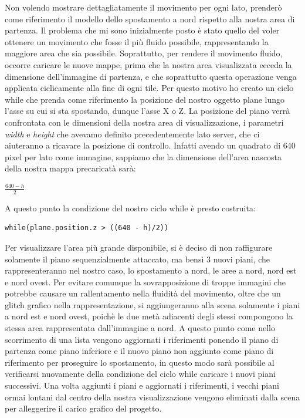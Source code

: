 Non volendo mostrare dettagliatamente il movimento per ogni lato, prenderò come riferimento il modello dello spostamento a nord rispetto alla nostra area di partenza. Il problema che mi sono inizialmente posto è stato quello del voler ottenere un movimento che fosse il più fluido possibile, rappresentando la maggiore area che sia possibile. Soprattutto, per rendere il movimento fluido, occorre caricare le nuove mappe, prima che la nostra area visualizzata ecceda la dimensione dell'immagine di partenza, e che soprattutto questa operazione venga applicata ciclicamente alla fine di ogni tile. Per questo motivo ho creato un ciclo while che prenda come riferimento la posizione del nostro oggetto plane lungo l'asse su cui si sta spostando, dunque l'asse X o Z. La posizione del piano verrà confrontata con le dimensioni della nostra area di visualizzazione, i parametri \textit{width} e \textit{height} che avevamo definito precedentemente lato server, che ci aiuteranno a ricavare la posizione di controllo. Infatti avendo un quadrato di 640 pixel per lato come immagine, sappiamo che la dimensione dell'area nascosta della nostra mappa precaricatà sarà:
\begin{center}
	\Large$\frac{640 - h}{2}$\par
\end{center}
A questo punto la condizione del nostro ciclo while è presto costruita:
\begin{verbatim}
while(plane.position.z > ((640 - h)/2))
\end{verbatim}

Per visualizzare l'area più grande disponibile, si è deciso di non raffigurare solamente il piano sequenzialmente attaccato, ma bensì 3 nuovi piani, che rappresenteranno nel nostro caso, lo spostamento a nord, le aree a nord, nord est e nord ovest. Per evitare comunque la sovrapposizione di troppe immagini che potrebbe causare un rallentamento nella fluidità del movimento, oltre che un glitch grafico nella rappresentazione, si aggiungeranno alla scena solamente i piani a nord est e nord ovest, poichè le due metà adiacenti degli stessi compongono la stessa area rappresentata dall'immagine a nord. A questo punto come nello scorrimento di una lista vengono aggiornati i riferimenti ponendo il piano di partenza come piano inferiore e il nuovo piano non aggiunto come piano di riferimento per proseguire lo spostamento, in questo modo sarà possibile al verificarsi nuovamente della condizione del ciclo while caricare i nuovi piani successivi. Una volta aggiunti i piani e aggiornati i riferimenti, i vecchi piani ormai lontani dal centro della nostra visualizzazione vengono eliminati dalla scena per alleggerire il carico grafico del progetto.

